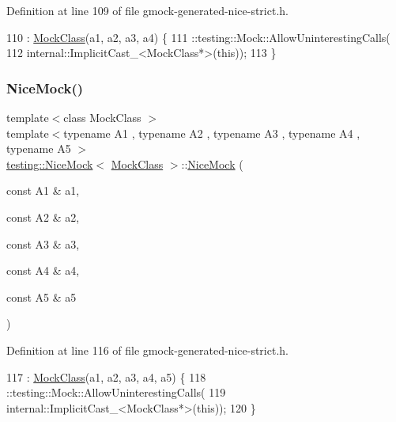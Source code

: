 Definition at line 109 of file gmock-\/generated-\/nice-\/strict.\+h.


\begin{DoxyCode}
110                     : \hyperlink{classMockClass}{MockClass}(a1, a2, a3, a4) \{
111     ::testing::Mock::AllowUninterestingCalls(
112         internal::ImplicitCast\_<MockClass*>(\textcolor{keyword}{this}));
113   \}
\end{DoxyCode}
\mbox{\label{classtesting_1_1NiceMock_a3812c0ba0d743f9a0c3d276dfc076f4c}} 
\subsubsection{\texorpdfstring{Nice\+Mock()}{NiceMock()}\hspace{0.1cm}{\footnotesize\ttfamily [6/11]}}
{\footnotesize\ttfamily template$<$class Mock\+Class $>$ \\
template$<$typename A1 , typename A2 , typename A3 , typename A4 , typename A5 $>$ \\
\hyperlink{classtesting_1_1NiceMock}{testing\+::\+Nice\+Mock}$<$ \hyperlink{classMockClass}{Mock\+Class} $>$\+::\hyperlink{classtesting_1_1NiceMock}{Nice\+Mock} (\begin{DoxyParamCaption}\item[{const A1 \&}]{a1,  }\item[{const A2 \&}]{a2,  }\item[{const A3 \&}]{a3,  }\item[{const A4 \&}]{a4,  }\item[{const A5 \&}]{a5 }\end{DoxyParamCaption})\hspace{0.3cm}{\ttfamily [inline]}}



Definition at line 116 of file gmock-\/generated-\/nice-\/strict.\+h.


\begin{DoxyCode}
117                     : \hyperlink{classMockClass}{MockClass}(a1, a2, a3, a4, a5) \{
118     ::testing::Mock::AllowUninterestingCalls(
119         internal::ImplicitCast\_<MockClass*>(\textcolor{keyword}{this}));
120   \}
\end{DoxyCode}
\mbox{\label{classtesting_1_1NiceMock_a156d0fce85ac08abffdf4aa0c3975f81}} 
